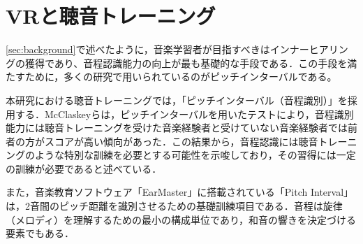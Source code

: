 \section{VRと聴音トレーニング}
\ref{sec:background}で述べたように，音楽学習者が目指すべきはインナーヒアリングの獲得であり、音程認識能力の向上が最も基礎的な手段である\cite{woody2012playing}．この手段を満たすために，多くの研究で用いられているのがピッチインターバルである\cite{pedersen2020spatialized, fletcher2019virtual}。

本研究における聴音トレーニングでは，「ピッチインターバル（音程識別）」を採用する．McClaskeyらは，ピッチインターバルを用いたテストにより，音程識別能力には聴音トレーニングを受けた音楽経験者と受けていない音楽経験者では前者の方がスコアが高い傾向があった．この結果から，音程認識には聴音トレーニングのような特別な訓練を必要とする可能性を示唆しており，その習得には一定の訓練が必要であると述べている\cite{mcclaskey2017standard}．

また，音楽教育ソフトウェア「EarMaster」に搭載されている「Pitch Interval」は，2音間のピッチ距離を識別させるための基礎訓練項目である．音程は旋律（メロディ）を理解するための最小の構成単位であり，和音の響きを決定づける要素でもある．
